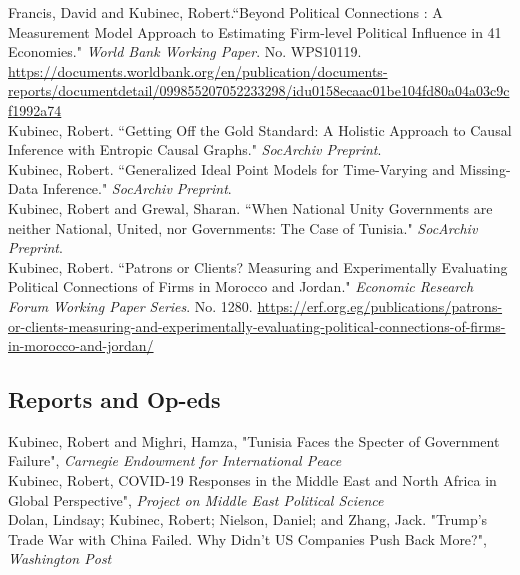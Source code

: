\documentclass[11pt, a4paper]{article}
\newcommand{\years}[1]{\marginnote{\scriptsize #1}}
\begin{document}
\years{2022}  Francis, David and Kubinec, Robert.``Beyond Political Connections : A Measurement Model Approach to Estimating Firm-level Political Influence in 41 Economies." \emph{World Bank Working Paper}. No. WPS10119. \url{https://documents.worldbank.org/en/publication/documents-reports/documentdetail/099855207052233298/idu0158ecaac01be104fd80a04a03c9cf1992a74}\\

\years{2022} Kubinec, Robert. ``Getting Off the Gold Standard: A Holistic Approach to Causal Inference with Entropic Causal Graphs." \emph{SocArchiv Preprint}. \\

\years{2020} Kubinec, Robert. ``Generalized Ideal Point Models for Time-Varying and Missing-Data Inference." \emph{SocArchiv Preprint}. \\

\years{2019} Kubinec, Robert and Grewal, Sharan. ``When National Unity Governments are neither National, United, nor Governments: The Case of Tunisia." \emph{SocArchiv Preprint}. \\

\years{2018} Kubinec, Robert. ``Patrons or Clients? Measuring and Experimentally Evaluating Political Connections of Firms in Morocco and Jordan." \emph{Economic Research Forum Working Paper Series}. No. 1280. \url{https://erf.org.eg/publications/patrons-or-clients-measuring-and-experimentally-evaluating-political-connections-of-firms-in-morocco-and-jordan/}\\

\subsection*{Reports and Op-eds}
\noindent
\years{2022}Kubinec, Robert and Mighri, Hamza, "Tunisia Faces the Specter of Government Failure", \emph{Carnegie Endowment for International Peace}\\

\years{2022}Kubinec, Robert, COVID-19 Responses in the Middle East and North Africa in Global Perspective", \emph{Project on Middle East Political Science}\\

\years{2022}Dolan, Lindsay; Kubinec, Robert; Nielson, Daniel; and Zhang, Jack. "Trump's Trade War with China Failed. Why Didn't US Companies Push Back More?", \emph{Washington Post}\\
\end{document}
